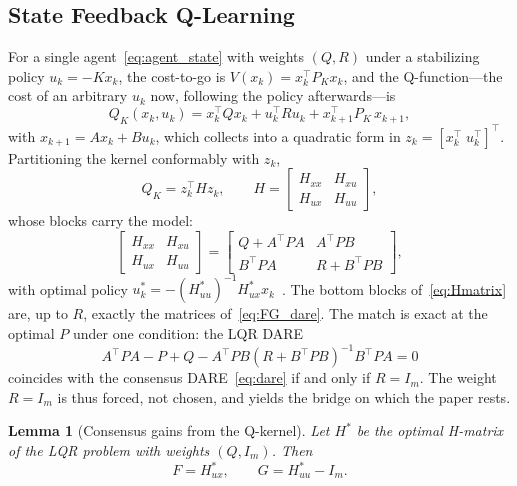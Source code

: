 \documentclass[final,5p,times]{elsarticle}
\theoremstyle{plain}
\newtheorem{lemma}{Lemma}
\theoremstyle{definition}
\theoremstyle{remark}
\begin{document}
\subsection{State Feedback Q-Learning}
\label{sec:sf_ql}
For a single agent~\eqref{eq:agent_state} with weights $(Q,R)$ under a stabilizing policy $u_k = -Kx_k$, the cost-to-go is $V(x_k) = x_k^\top P_K x_k$, and the Q-function---the cost of an arbitrary $u_k$ now, following the policy afterwards---is
\begin{equation}
Q_K(x_k,u_k) = x_k^\top Q x_k + u_k^\top R u_k + x_{k+1}^\top P_K\, x_{k+1},
\label{eq:qdef}
\end{equation}
with $x_{k+1} = Ax_k + Bu_k$, which collects into a quadratic form in $z_k = [x_k^\top\; u_k^\top]^\top$. Partitioning the kernel conformably with $z_k$,
\begin{equation}
Q_K = z_k^\top H z_k, \qquad
H = \begin{bmatrix} H_{xx} & H_{xu} \\ H_{ux} & H_{uu} \end{bmatrix},
\label{eq:Hpartition}
\end{equation}
whose blocks carry the model:
\begin{equation}
\begin{bmatrix} H_{xx} & H_{xu} \\ H_{ux} & H_{uu} \end{bmatrix}
= \begin{bmatrix} Q + A^\top\! PA & A^\top\! PB \\ B^\top\! PA & R + B^\top\! PB \end{bmatrix},
\label{eq:Hmatrix}
\end{equation}
with optimal policy $u_k^* = -(H_{uu}^*)^{-1}H_{ux}^* x_k$~\cite{bradtke1994}. The bottom blocks of~\eqref{eq:Hmatrix} are, up to $R$, exactly the matrices of~\eqref{eq:FG_dare}. The match is exact at the optimal $P$ under one condition: the LQR DARE
\begin{equation}
A^\top\! PA - P + Q - A^\top\! PB(R + B^\top\! PB)^{-1}B^\top\! PA = 0
\label{eq:dare_lqr}
\end{equation}
coincides with the consensus DARE~\eqref{eq:dare} if and only if $R = I_m$. The weight $R = I_m$ is thus forced, not chosen, and yields the bridge on which the paper rests.
\begin{lemma}[Consensus gains from the Q-kernel]
\label{prop:FG_recovery}
Let $H^*$ be the optimal H-matrix of the LQR problem with weights $(Q, I_m)$. Then
\begin{equation}
F = H_{ux}^*, \qquad G = H_{uu}^* - I_m.
\label{eq:FG_from_H}
\end{equation}
\end{lemma}
\end{document}
